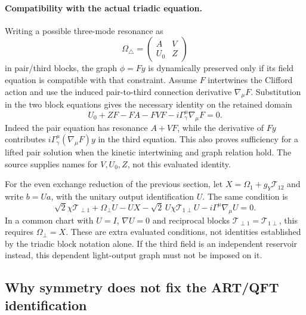 \documentclass[11pt,a4paper]{article}
\begin{document}
\paragraph{Compatibility with the actual triadic equation.}
Writing a possible three-mode resonance as
\[
 \Omega_\triangle=\begin{pmatrix}A&V\\U_0&Z\end{pmatrix}
\]
in pair/third blocks, the graph $\phi=Fy$ is dynamically preserved
only if its field equation is compatible with that constraint.
Assume $F$ intertwines the Clifford action and use the induced
pair-to-third connection derivative $\nabla_\mu F$. Substitution
in the two block equations gives the necessary identity on the
retained domain
\[
 \boxed{\displaystyle
 U_0+ZF-FA-FVF-i\Gamma_\gamma^\mu\nabla_\mu F=0.}
\]
Indeed the pair equation has resonance $A+VF$, while the derivative
of $Fy$ contributes $i\Gamma_\gamma^\mu(\nabla_\mu F)y$ in
the third equation. This also proves sufficiency for a lifted pair
solution when the kinetic intertwining and graph relation hold.
The source supplies names for $V,U_0,Z$, not this evaluated identity.

For the even exchange reduction of the previous section, let
$X=\Omega_1+g_Y\mathcal T_{12}$ and write $b=Ua$, with the
unitary output identification $U$. The same condition is
\[
 \sqrt2\chi\mathcal T_{\perp1}+\Omega_\perp U-UX
 -\sqrt2\,U\chi\mathcal T_{1\perp}U
 -i\Gamma^\mu\nabla_\mu U=0.
\]
In a common chart with $U=I$, $\nabla U=0$ and reciprocal blocks
$\mathcal T_{\perp1}=\mathcal T_{1\perp}$, this requires
$\Omega_\perp=X$. These are extra evaluated conditions, not
identities established by the triadic block notation alone.
If the third field is an independent reservoir instead, this
dependent light-output graph must not be imposed on it.

\subsection{Why symmetry does not fix the ART/QFT identification}
\end{document}
